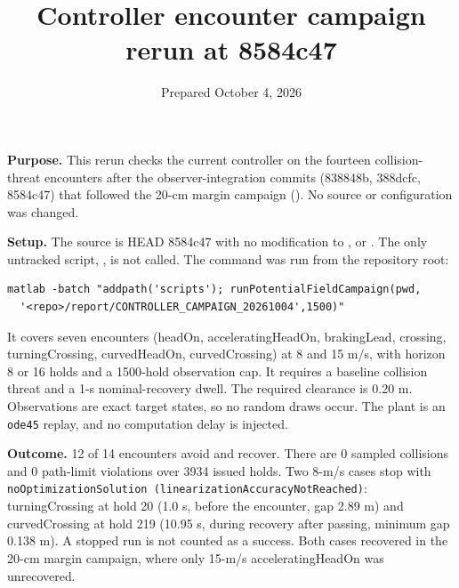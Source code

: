 \documentclass[11pt]{article}
\title{Controller encounter campaign rerun at 8584c47}
\date{Prepared October 4, 2026}
\begin{document}
\maketitle

\textbf{Purpose.} This rerun checks the current controller on the fourteen
collision-threat encounters after the observer-integration commits
(838848b, 388dcfc, 8584c47) that followed the 20-cm margin campaign
(). No source or configuration was changed.

\textbf{Setup.} The source is HEAD 8584c47 with no modification to
,  or . The only untracked
script, , is not called. The
command was run from the repository root:
\begin{verbatim}
matlab -batch "addpath('scripts'); runPotentialFieldCampaign(pwd,
  '<repo>/report/CONTROLLER_CAMPAIGN_20261004',1500)"
\end{verbatim}
It covers seven encounters (headOn, acceleratingHeadOn, brakingLead, crossing,
turningCrossing, curvedHeadOn, curvedCrossing) at 8 and 15 m/s, with horizon 8
or 16 holds and a 1500-hold observation cap. It requires a baseline collision
threat and a 1-s nominal-recovery dwell. The required clearance is 0.20 m.
Observations are exact target states, so no random draws occur. The plant is an
\texttt{ode45} replay, and no computation delay is injected.

\textbf{Outcome.} 12 of 14 encounters avoid and recover. There are 0 sampled
collisions and 0 path-limit violations over 3934 issued holds. Two 8-m/s
cases stop with
\texttt{noOptimizationSolution (linearizationAccuracyNotReached)}:
turningCrossing at hold 20 (1.0 s, before the encounter, gap 2.89 m) and
curvedCrossing at hold 219 (10.95 s, during recovery after passing, minimum
gap 0.138 m). A stopped run is not counted as a success. Both cases recovered
in the 20-cm margin campaign, where only 15-m/s acceleratingHeadOn was
unrecovered.
\end{document}
